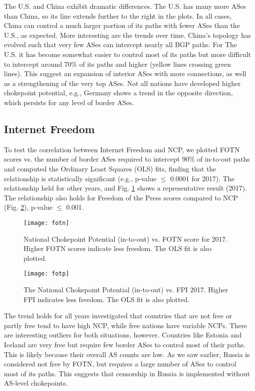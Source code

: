 The U.S. and China exhibit dramatic differences. The U.S. has many
more ASes than China, so its line extends further to the right in the
plots. In all cases, China can control a much larger portion of its
paths with fewer ASes than the U.S., as expected. More interesting are
the trends over time.  China's topology has evolved such that very few
ASes can intercept nearly all BGP paths. For The U.S. it has become
somewhat easier to control most of its paths but more difficult to
intercept around 70\% of its paths and higher (yellow lines crossing
green lines).  This suggest an expansion of interior ASes with more
connections, as well as a strengthening of the very top ASes.
Not all nations have developed higher chokepoint potential, e.g., Germany shows a trend
in the opposite direction, which persists for any level of border ASes.

\subsection{Internet Freedom}

To test the correlation between Internet Freedom and NCP, we plotted
FOTN scores vs. the number of border ASes required to intercept 90\% of in-to-out
paths and computed the Ordinary
Least Squares (OLS) fits, finding that the relationship is
statistically significant (e.g., p-value $\leq$ 0.0001 for 2017). The
relationship held for other years, and 
Fig. \ref{fig:fotn} shows a representative result (2017).  The relationship also holds for Freedom of the Press scores compared to NCP (Fig. \ref{fig:fotp}), p-value $\leq$ 0.001.

\begin{figure}
	\centering
	\texttt{[image: fotn]}
	\caption{National Chokepoint Potential (in-to-out) vs. FOTN score
	for 2017. Higher FOTN scores indicate less freedom. The OLS fit is also plotted.}\label{fig:fotn}
\end{figure}

\begin{figure}
	\centering
	\texttt{[image: fotp]}
	\caption{The National Chokepoint Potential (in-to-out) vs. FPI
	2017. Higher FPI indicates less freedom. The OLS fit is also plotted.}\label{fig:fotp}
\end{figure}

The trend holds for all years investigated that countries that are
not free or partly free tend to have high NCP, while free nations have
variable NCPs. There are interesting outliers for both situations,
however. Countries like Estonia and Iceland are very free but
require few border ASes to control most of their paths. This is likely
because their overall AS counts are low. As we saw earlier, Russia
is considered not free by FOTN, but requires a large number of
ASes to control most of its paths. This suggests that censorship
in Russia is implemented without AS-level
chokepoints.
